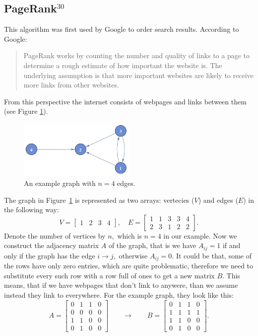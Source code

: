 \documentclass[a4paper, fleqn, 10pt]{report}
\theoremstyle{definition}
\begin{document}
\subsection*{PageRank$^{30}$}
This algorithm was first used by Google to order search results.
According to Google:
\begin{quote}
PageRank works by counting the number and quality of links to a page to determine a rough estimate of how important the website is.
The underlying assumption is that more important websites are likely to receive more links from other websites.
\end{quote}
From this perspective the internet consists of webpages and links between them (see Figure \ref{fig:graph}).
\begin{figure}[ht!]
 \centering
 \includegraphics[width=0.5\textwidth]{graph}
 \caption{An example graph with $n=4$ edges.}\label{fig:graph}
\end{figure}
The graph in Figure~\ref{fig:graph} is represented as two arrays: vertecies ($V$) and edges ($E$)
in the following way:
\[V=
\begin{bmatrix}
1 & 2 & 3 & 4
\end{bmatrix},
\quad
E=\begin{bmatrix}
1 & 1 & 3 & 3 & 4\\
2 & 3 & 1 & 2 & 2
\end{bmatrix}.
\]
Denote the number of vertices by $n,$ which is $n=4$ in our example.
Now we construct the adjacency matrix $A$ of the graph, that is we have $A_{ij}=1$
if and only if the graph has the edge $i\to j,$ otherwise $A_{ij}=0.$
It could be that, some of the rows have only zero entries, which are quite problematic, therefore
we need to substitute every such row with a row full of ones to get a new matrix $B.$
This means, that if we have webpages that don't link to anywere, than we assume
instead they link to everywhere.
For the example graph, they look like this:
\[
A = 
\begin{bmatrix}
0 & 1 & 1 & 0\\
0 & 0 & 0 & 0\\
1 & 1 & 0 & 0\\
0 & 1 & 0 & 0
\end{bmatrix}
\qquad\longrightarrow
\qquad
B = 
\begin{bmatrix}
0 & 1 & 1 & 0\\
1 & 1 & 1 & 1\\
1 & 1 & 0 & 0\\
0 & 1 & 0 & 0
\end{bmatrix}.
\]
\end{document}
